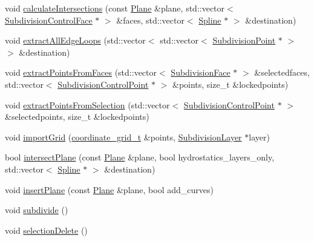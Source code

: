 \begin{DoxyCompactItemize}
\item 
void \hyperlink{classShipCAD_1_1SubdivisionSurface_a576a4d43e01ca50782ba724f63f1b2bd}{calculate\-Intersections} (const \hyperlink{classShipCAD_1_1Plane}{Plane} \&plane, std\-::vector$<$ \hyperlink{classShipCAD_1_1SubdivisionControlFace}{Subdivision\-Control\-Face} $\ast$ $>$ \&faces, std\-::vector$<$ \hyperlink{classShipCAD_1_1Spline}{Spline} $\ast$ $>$ \&destination)
\item 
void \hyperlink{classShipCAD_1_1SubdivisionSurface_a17dccf4965b49427d345bd5acce897c5}{extract\-All\-Edge\-Loops} (std\-::vector$<$ std\-::vector$<$ \hyperlink{classShipCAD_1_1SubdivisionPoint}{Subdivision\-Point} $\ast$ $>$ $>$ \&destination)
\item 
void \hyperlink{classShipCAD_1_1SubdivisionSurface_af62ba549d058dfddd4bfa1b69a577220}{extract\-Points\-From\-Faces} (std\-::vector$<$ \hyperlink{classShipCAD_1_1SubdivisionFace}{Subdivision\-Face} $\ast$ $>$ \&selectedfaces, std\-::vector$<$ \hyperlink{classShipCAD_1_1SubdivisionControlPoint}{Subdivision\-Control\-Point} $\ast$ $>$ \&points, size\-\_\-t \&lockedpoints)
\item 
void \hyperlink{classShipCAD_1_1SubdivisionSurface_af0f0d7bb979c8c8ba04b9be26e7cfe30}{extract\-Points\-From\-Selection} (std\-::vector$<$ \hyperlink{classShipCAD_1_1SubdivisionControlPoint}{Subdivision\-Control\-Point} $\ast$ $>$ \&selectedpoints, size\-\_\-t \&lockedpoints)
\item 
void \hyperlink{classShipCAD_1_1SubdivisionSurface_aa193fd28425e9846908479615e7c5bf9}{import\-Grid} (\hyperlink{classShipCAD_1_1SubdivisionSurface_a8ed657cb7d4cd34662bd2d3e949d3e3b}{coordinate\-\_\-grid\-\_\-t} \&points, \hyperlink{classShipCAD_1_1SubdivisionLayer}{Subdivision\-Layer} $\ast$layer)
\item 
bool \hyperlink{classShipCAD_1_1SubdivisionSurface_ab7191008f7ec3ef34b578b27e4340927}{intersect\-Plane} (const \hyperlink{classShipCAD_1_1Plane}{Plane} \&plane, bool hydrostatics\-\_\-layers\-\_\-only, std\-::vector$<$ \hyperlink{classShipCAD_1_1Spline}{Spline} $\ast$ $>$ \&destination)
\item 
void \hyperlink{classShipCAD_1_1SubdivisionSurface_ada26b740ea1f317763b6ecd372f13ea2}{insert\-Plane} (const \hyperlink{classShipCAD_1_1Plane}{Plane} \&plane, bool add\-\_\-curves)
\item 
void \hyperlink{classShipCAD_1_1SubdivisionSurface_ad9970c667fa8e33ff8b35eb6a48b6a2e}{subdivide} ()
\item 
void \hyperlink{classShipCAD_1_1SubdivisionSurface_a99bda5b49300775eda1df60451412686}{selection\-Delete} ()

\end{DoxyCompactItemize}
